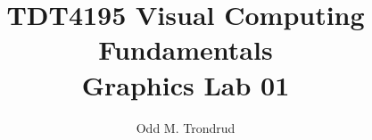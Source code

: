 \setlength{\headheight}{15pt} %
\setlength{\headsep}{30pt} %
\pagestyle{fancy}

\title{TDT4195 Visual Computing Fundamentals\\
Graphics Lab 01}
\author{Odd M. Trondrud}

\chead{}



